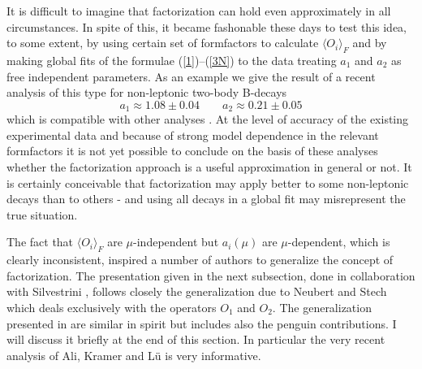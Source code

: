 It is difficult to imagine that factorization
can hold even approximately in all circumstances. 
In spite of this, it
became fashonable these days to
test this idea, 
to some extent, by using certain set of formfactors to calculate
$ \langle O_i\rangle_F  $ and by making global fits of the 
formulae (\ref{1})--(\ref{3N})
to the data treating
$ a_1 $ and $ a_2 $ as free independent parameters. As an example we
give the result of a recent
analysis of this type for non-leptonic two-body B-decays
\cite{NS97}  
\begin{equation}\label{8N}
a_1\approx 1.08\pm0.04
\qquad
a_2\approx 0.21\pm0.05
\end{equation}
which is compatible with other analyses 
\cite{Cheng,Soares,LNF,GNF,AKL98}.
At the level of accuracy of the existing  experimental data and 
because of strong model
dependence in the relevant formfactors it is not yet possible  
to conclude on the basis of these analyses whether the
factorization approach is a useful approximation in general or not. 
It is
certainly  conceivable that factorization may apply better to some
non-leptonic decays than to others 
\cite{NEUBERT}-\cite{ISGUR}
and using all decays in a global fit may misrepresent the true
situation. 

The fact that $\langle O_i\rangle_F$ are $\mu$-independent but
$a_i(\mu)$ are $\mu$-dependent, which is clearly inconsistent,
inspired a number of authors \cite{Cheng,Soares, NS97,GNF,AKL98} to
generalize the concept of factorization. The presentation given
in the next subsection, done in collaboration with Silvestrini 
\cite{BUSI},
follows closely the generalization due to 
Neubert and Stech
\cite{NS97} which deals exclusively with the operators $O_1$ and
$O_2$. The generalization presented in \cite{Cheng,GNF,AKL98} are
similar in spirit but includes also the penguin contributions. I will
discuss it briefly at the end of this section. In particular
the very recent analysis of Ali, Kramer and L\"u \cite{AKL98} 
is very informative.
